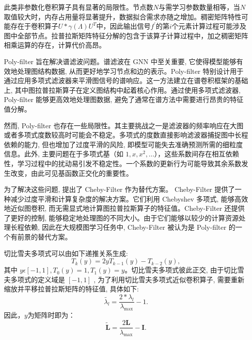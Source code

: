 此类非参数化卷积算子具有显著的局限性。节点数\({N}\)与需学习参数数量相等，当\({N}\)取值较大时，内存占用量将显著提升，数据拟合需求亦随之增加。稠密矩阵特性可能存在于卷积算子\(U * \gamma \left( \Lambda \right) {U}^{T}\)中，因此输出信号\({f}^{\prime }\)的第\({i}\)个元素计算过程可能涉及图中全部节点。拉普拉斯矩阵特征分解的包含于该算子计算过程中，加之稠密矩阵相乘运算的存在，计算代价高昂。

Poly-filter \parencite{2021_Han_Dynamic_and_multi_faceted_spatio_temporal_deep_learning_for_traffic_speed_forecasting} 旨在解决谱滤波问题。谱滤波在 GNN 中至关重要, 它使得模型能够有效地处理图结构数据, 从而更好地学习节点和边的表示。Poly-filter 特别设计用于通过应用多项式滤波器来平滑图信号的谱响应。这一方法建立在谱卷积框架的基础上, 其中图拉普拉斯算子在定义图结构中起着核心作用。通过使用多项式滤波器, Poly-filter 能够更高效地处理图数据, 避免了通常在谱方法中需要进行昂贵的特征值分解。

然而, Poly-filter 也存在一些局限性。其主要挑战之一是滤波器的频率响应在大图或者多项式度数较高时可能会不稳定。多项式的度数直接影响滤波器捕捉图中长程依赖的能力, 但也增加了过度平滑的风险, 即模型可能失去准确预测所需的细粒度信息。此外, 主要问题在于多项式基（如 \(1, {x}, {{x}}^{2}, \ldots\)），这些系数间存在相互依赖性，学习过程中的扰动易引发不稳定性。一个系数的更新行为可能导致其余系数发生改变，由此可见基函数正交化的重要性。

为了解决这些问题, \textcite{2016_Defferrard_Convolutional_neural_networks_on_graphs_with_fast_localized_spectral_filtering} 提出了 Cheby-Filter 作为替代方案。 Cheby-Filter 提供了一种减少过度平滑和计算复杂度的解决方案。它们利用 Chebyshev 多项式, 能够高效地近似图卷积, 而无需显式地计算图拉普拉斯算子的特征值。Cheby-Filter 还提供了更好的控制, 能够稳定地处理图的不同大小。由于它们能够以较少的计算资源处理长程依赖, 因此在大规模图学习任务中, Cheby-Filter 被认为是 Poly-filter 的一个有前景的替代方案。

切比雪夫多项式可以由如下递推关系生成:
\[
{T}_{k}\left( y\right)  = {2y}{T}_{k - 1}\left( y\right)  - {T}_{k - 2}\left( y\right), 
\]
其中 \({y\epsilon }\left\lbrack  {-1, 1}\right\rbrack  , {T}_{0}\left( y\right)  = 1, {T}_{1}\left( y\right)  = y\)。切比雪夫多项式彼此正交, 由于切比雪夫多项式的定义域是 \(\left\lbrack  {-1, 1}\right\rbrack\) , 为了利用切比雪夫多项式近似卷积算子, 需要重新缩放并平移拉普拉斯矩阵的特征值, 具体如下:
\[
\widetilde{{\lambda }_{l}} = \frac{2 * {\lambda }_{l}}{{\lambda }_{\max }} - 1.
\]
因此，$y$为矩阵时即为：
\[\tilde{\boldsymbol{L}}=\frac{2\boldsymbol{L}}{\lambda_{\max}}-\boldsymbol{I}.\]


